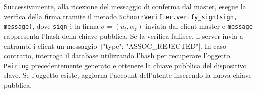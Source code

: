 Successivamente, alla ricezione del messaggio di conferma dal master, esegue la verifica della firma tramite il metodo \texttt{SchnorrVerifier.verify\_sign(sign, message)}, dove \texttt{sign} è la firma $\sigma = (u_t, \alpha_z)$ inviata dal client master e \texttt{message} rappresenta l'hash della chiave pubblica.
Se la verifica fallisce, il server invia a entrambi i client un messaggio \texttt|{"type": "ASSOC_REJECTED"}|. In caso contrario, interroga il database utilizzando l'hash per recuperare l'oggetto \texttt{Pairing} precedentemente generato e ottenere la chiave pubblica del dispositivo slave. Se l'oggetto esiste, aggiorna l'account dell'utente inserendo la nuova chiave pubblica.

\newpage

\begin{figure}[!ht]
\centering
\end{figure}

